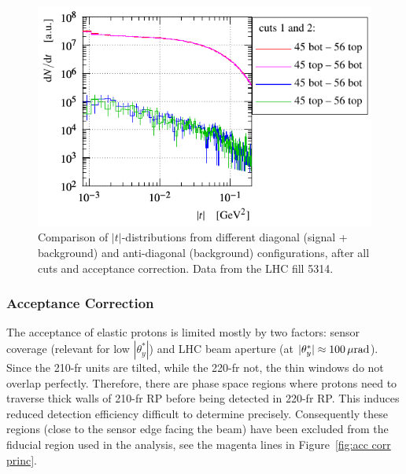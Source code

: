 \begin{figure}
\begin{center}
\includegraphics{fig/t_dist_antidgn_cmp.pdf}
\caption{%
Comparison of $|t|$-distributions from different diagonal (signal + background) and anti-diagonal (background) configurations, after all cuts and acceptance correction. Data from the LHC fill 5314.
}
\label{fig:tag bckg dist}
\end{center}
\end{figure}




\subsubsection{Acceptance Correction}
\label{sec:acc corr}

The acceptance of elastic protons is limited mostly by two factors: sensor coverage (relevant for low $|\theta^*_y|$) and LHC beam aperture (at $|\theta^*_y| \approx 100\,{\rm \mu rad}$). Since the 210-fr units are tilted, while the 220-fr not, the thin windows do not overlap perfectly. Therefore, there are phase space regions where protons need to traverse thick walls of 210-fr RP before being detected in 220-fr RP. This induces reduced detection efficiency difficult to determine precisely. Consequently these regions (close to the sensor edge facing the beam) have been excluded from the fiducial region used in the analysis, see the magenta lines in Figure~\ref{fig:acc corr princ}.

